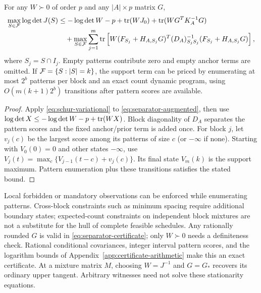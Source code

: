 \begin{theorem}\label{thm:separator-certificate}
For any $W\succ0$ of order $p$ and any $|A|\times p$ matrix $G$,
\begin{align}
 \max_{S\in\mathcal F}\log\det J(S)
 &\le -\log\det W-p+\operatorname{tr}(WJ_0)+\operatorname{tr}(WG^TK_A^{-1}G)
 \nonumber\\[-2pt]
 &\quad+\max_{S\in\mathcal F}\sum_{j=1}^m
 \operatorname{tr}\left[W(F_{S_j}+H_{A,S_j}G)^T
 (D_A)_{S_jS_j}^{-1}(F_{S_j}+H_{A,S_j}G)\right],
 \label{eq:separator-certificate}
\end{align}
where $S_j=S\cap I_j$. Empty patterns contribute zero and empty anchor
terms are omitted. If $\mathcal F=\{S:|S|=k\}$, the support term can be priced
by enumerating at most $2^b$ patterns per block and an exact count dynamic
program, using $O(m(k+1)2^b)$ transitions after pattern scores are available.
\end{theorem}
\begin{proof}
Apply \eqref{eq:schur-variational} to \eqref{eq:separator-augmented},
then use $\log\det X\le-\log\det W-p+\operatorname{tr}(WX)$.
Block diagonality of $D_A$ separates the pattern scores and the fixed
anchor/prior term is added once. For block $j$, let $v_j(c)$ be the largest
score among its patterns of size $c$ (or $-\infty$ if none).
Starting with $V_0(0)=0$ and other states $-\infty$, use
$V_j(t)=\max_c\{V_{j-1}(t-c)+v_j(c)\}$. Its final state $V_m(k)$ is the
support maximum. Pattern enumeration plus these transitions satisfies the
stated bound.
\end{proof}
Local forbidden or mandatory observations can be enforced while enumerating
patterns. Cross-block constraints such as minimum spacing require additional
boundary states; expected-count constraints on independent block mixtures
are not a substitute for the hull of complete feasible schedules.
Any rationally rounded $G$ is valid in \eqref{eq:separator-certificate};
only $W\succ0$ needs a definiteness check. Rational conditional covariances,
integer interval pattern scores, and the logarithm bounds of
Appendix~\ref{app:certificate-arithmetic} make this an exact certificate.
At a mixture matrix $M$, choosing $W=J^{-1}$ and $G=G_*$ recovers its ordinary
upper tangent. Arbitrary witnesses need not solve these stationarity equations.

